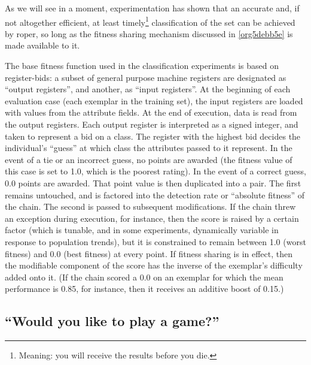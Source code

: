 \documentclass[12pt,glossary]{dalthesis}
\begin{document}
As we will see in a moment, experimentation has shown that an accurate and, if not
altogether efficient, at least timely\footnote{Meaning: you will receive the results before you die.} classification of the set can be achieved by
\gls{roper}, so long as the fitness sharing mechanism discussed in \ref{org5debb5e}
is made available to it. 

The base fitness function used in the classification experiments is based on
register-bids: a subset of general purpose machine registers are designated
as ``output registers'', and another, as ``input registers''. At the beginning of
each evaluation case (each exemplar in the training set), the input registers
are loaded with values from the attribute fields. At the end of execution,
data is read from the output registers. Each output register is interpreted
as a signed integer, and taken to represent a bid on a class. The register
with the highest bid decides the individual's ``guess'' at which class the
attributes passed to it represent. In the event of a tie or an incorrect
guess, no points are awarded (the fitness value of this case is set to 1.0,
which is the poorest rating). In the event of a correct guess, 0.0 points
are awarded. That point value is then duplicated into a pair. The first
remains untouched, and is factored into the detection rate or ``absolute
fitness'' of the chain. The second is passed to subsequent modifications.
If the chain threw an exception during execution, for instance, then the
score is raised by a certain factor (which is tunable, and in some experiments,
dynamically variable in response to population trends), but it is constrained
to remain between 1.0 (worst fitness) and 0.0 (best fitness) at every point.
If fitness sharing is in effect, then the modifiable component of the score
has the inverse of the exemplar's difficulty added onto it. (If the chain
scored a 0.0 on an exemplar for which the mean performance is 0.85, for instance,
then it receives an additive boost of 0.15.)



\subsection{``Would you like to play a game?''}
\label{sec:org7b1d623}
\label{org24f05ed}
\end{document}
